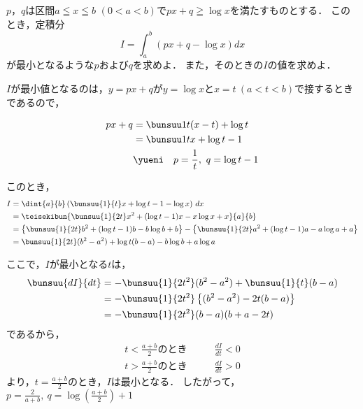 \begin{problem}
  $p$，$q$は区間$a \leqq x \leqq b$ $(0<a<b)$で$px+q\geqq\log x$を満たすものとする．
このとき，定積分
\[ I=\int_a^b(px+q-\log x)dx \]
が最小となるような$p$および$q$を求めよ．
また，そのときの$I$の値を求めよ．
\end{problem}



$I$が最小値となるのは，$y = px + q$が$y = \log x$と$x=t\ (a<t<b)$で接するときであるので，

\begin{align*}
  px+q &= \bunsuu1{t}(x-t) + \log t\\
  &= \bunsuu1{t}x + \log t - 1 \\
  &\yueni\quad p = \frac1{t},\ q = \log t -1
\end{align*}

このとき，
\begin{align*}
  I &= \dint{a}{b}\left(\bunsuu{1}{t}x + \log t - 1 - \log x\right)\,dx \\
  &= \teisekibun{\bunsuu{1}{2t}x^2 + (\log t - 1)x - x\log x + x}{a}{b} \\
  &= \left\{\bunsuu{1}{2t}b^2 + (\log t -1)b - b\log b + b\right\}
  -\left\{\bunsuu{1}{2t}a^2 + (\log t - 1)a - a\log a + a\right\} \\
  &= \bunsuu{1}{2t}(b^2-a^2) + \log t(b-a) - b\log b + a\log a\\
\end{align*}

ここで，$I$が最小となる$t$は，
\begin{align*}
  \bunsuu{dI}{dt} &= -\bunsuu{1}{2t^2}(b^2-a^2) + \bunsuu{1}{t}(b-a) \\
  &= -\bunsuu{1}{2t^2}\left\{(b^2-a^2) - 2t(b-a)\right\} \\
  &= -\bunsuu{1}{2t^2}(b-a)(b+a-2t)
\end{align*}
であるから，
\begin{align*}
  t < \frac{a+b}{2} のとき \qquad&\frac{dI}{dt} < 0\\
  t > \frac{a+b}{2} のとき \qquad&\frac{dI}{dt} > 0
\end{align*}
より，$t = \frac{a+b}{2}$のとき，$I$は最小となる．
したがって，$p = \frac{2}{a+b},\ q = \log \left(\frac{a+b}{2}\right) + 1$


